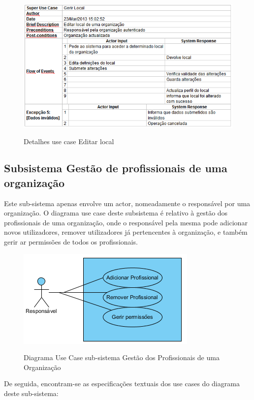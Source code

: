 \documentclass[12pt,a4paper]{article}
\begin{document}
\begin{figure}[h!]
\centering
\includegraphics[scale=0.7]{d_usecase/editarlocal}
\label{usecase}
\caption{Detalhes use case Editar local}
\end{figure}

\subsection{Subsistema Gestão de profissionais de uma organização}
Este sub-sistema apenas envolve um actor, nomeadamente o responsável por uma organização. O diagrama
use case deste subsistema é relativo à gestão dos profissionais de uma organização, onde o responsável pela mesma pode adicionar novos utilizadores, remover utilizadores já pertencentes à organização, e também gerir ar permissões de todos os profissionais.\\

\begin{figure}[h!]
\centering
\includegraphics[scale=1]{usecase/R_GerirProfissionais}
\label{usecase}
\caption{Diagrama Use Case sub-sistema Gestão dos Profissionais de uma Organização}
\end{figure}

De seguida, encontram-se as especificações textuais dos use cases do diagrama deste sub-sistema:\\
\end{document}
